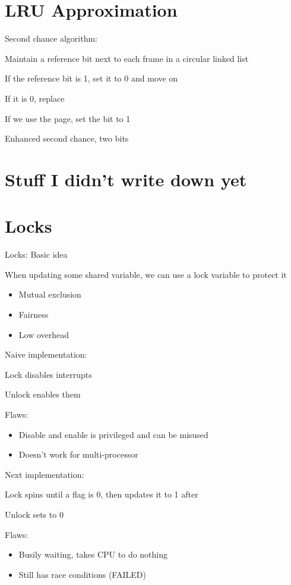 \documentclass[12pt]{article}
\begin{document}
\section{LRU Approximation}

Second chance algorithm:

Maintain a reference bit next to each frame in a circular linked list

If the reference bit is 1, set it to 0 and move on

If it is 0, replace

If we use the page, set the bit to 1

Enhanced second chance, two bits

\section{Stuff I didn't write down yet}

\newpage
\section{Locks}

Locks: Basic idea

When updating some shared variable, we can use a lock variable to protect it

\begin{itemize}
    \item Mutual exclusion
    \item Fairness
    \item Low overhead
\end{itemize}

Naive implementation:

Lock disables interrupts

Unlock enables them

Flaws:
\begin{itemize}
    \item Disable and enable is privileged and can be misused
    \item Doesn't work for multi-processor
\end{itemize}

Next implementation:

Lock spins until a flag is 0, then updates it to 1 after

Unlock sets to 0

Flaws:
\begin{itemize}
    \item Busily waiting, takes CPU to do nothing
    \item Still has race conditions (FAILED)
\end{itemize}
\end{document}
